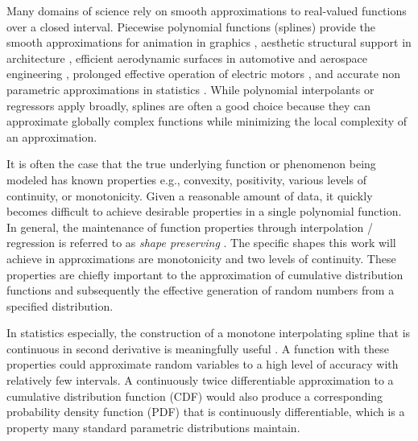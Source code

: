 \documentclass{scspaperproc}
\theoremstyle{scsthe}
\begin{document}


Many domains of science rely on smooth approximations to real-valued functions over a closed interval. Piecewise polynomial functions (splines) provide the smooth approximations for animation in graphics \cite{herman2015techniques,quint2003scalable}, aesthetic structural support in architecture \cite{brennan2019measure}, efficient aerodynamic surfaces in automotive and aerospace engineering \cite{brennan2019measure}, prolonged effective operation of electric motors , and accurate non parametric approximations in statistics \cite{knott2012interpolating}. While polynomial interpolants or regressors apply broadly, splines are often a good choice because they can approximate globally complex functions while minimizing the local complexity of an approximation.

It is often the case that the true underlying function or phenomenon being modeled has known properties e.g., convexity, positivity, various levels of continuity, or monotonicity. Given a reasonable amount of data, it quickly becomes difficult to achieve desirable properties in a single polynomial function. In general, the maintenance of function properties through interpolation / regression is referred to as \textit{shape preserving} \cite{fritsch1980monotone,gregory1985shape}. The specific shapes this work will achieve in approximations are monotonicity and two levels of continuity. These properties are chiefly important to the approximation of cumulative distribution functions and subsequently the effective generation of random numbers from a specified distribution.

In statistics especially, the construction of a monotone interpolating spline that is continuous in second derivative is meaningfully useful \cite{ramsay1988monotone}. A function with these properties could approximate random variables to a high level of accuracy with relatively few intervals. A continuously twice differentiable approximation to a cumulative distribution function (CDF) would also produce a corresponding probability density function (PDF) that is continuously differentiable, which is a property many standard parametric distributions maintain.
\end{document}

